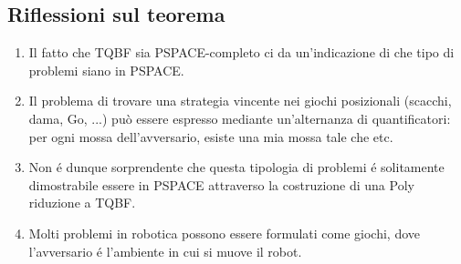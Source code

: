 \documentclass[a4paper, 12pt]{article}
\begin{document}
\subsection{Riflessioni sul teorema}
\begin{enumerate}
\item Il fatto che TQBF sia PSPACE-completo ci da un’indicazione di che tipo di problemi siano in PSPACE.
\item Il problema di trovare una strategia vincente nei giochi posizionali (scacchi, dama, Go, ...) può essere espresso mediante un’alternanza di quantificatori: per ogni mossa dell'avversario, esiste una mia mossa tale che etc.
\item Non é dunque sorprendente che questa tipologia di problemi é solitamente dimostrabile essere in PSPACE attraverso la costruzione di una Poly riduzione a TQBF.
\item Molti problemi in robotica possono essere formulati come giochi, dove l’avversario é l’ambiente in cui si muove il robot.
\end{enumerate}
\end{document}

